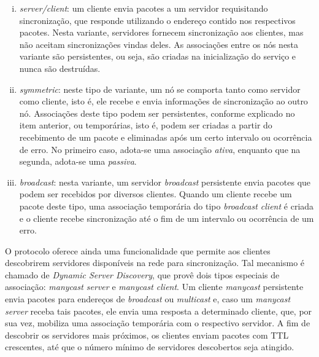 \begin {enumerate}[i.]
  
  \item \textit{server/client}: um cliente envia pacotes a um servidor
  requisitando sincronização, que responde utilizando o endereço contido nos
  respectivos pacotes. Nesta variante, servidores fornecem sincronização aos
  clientes, mas não aceitam sincronizações vindas deles. As associações
  entre os nós nesta variante são persistentes, ou seja, são criadas na
  inicialização do serviço e nunca são destruídas.
  
  \item \textit{symmetric}: neste tipo de variante, um nó se comporta tanto como
  servidor como cliente, isto é, ele recebe e envia informações de sincronização
  ao outro nó. Associações deste tipo podem ser persistentes, conforme explicado
  no item anterior, ou temporárias, isto é, podem ser criadas a partir do
  recebimento de um pacote e eliminadas após um certo intervalo ou ocorrência
  de erro. No primeiro caso, adota-se uma associação \textit{ativa}, enquanto
  que na segunda, adota-se uma \textit{passiva}.
      
  \item \textit{broadcast}: nesta variante, um servidor \textit{broadcast}
  persistente envia pacotes que podem ser recebidos por diversos clientes.
  Quando um cliente recebe um pacote deste tipo, uma associação temporária do
  tipo \textit{broadcast client} é criada e o cliente recebe sincronização até o
  fim de um intervalo ou ocorrência de um erro.
  
\end{enumerate}

O protocolo oferece ainda uma funcionalidade que permite aos clientes
descobrirem servidores disponíveis na rede para sincronização. Tal mecanismo é
chamado de \textit{Dynamic Server Discovery}, que provê dois tipos especiais de
associação: \textit{manycast server} e \textit{manycast client}. Um cliente
\textit{manycast} persistente envia pacotes para endereços de \textit{broadcast}
ou \textit{multicast} e, caso um \textit{manycast server} receba tais pacotes,
ele envia uma resposta a determinado cliente, que, por sua vez, mobiliza uma
associação temporária com o respectivo servidor. A fim de descobrir os
servidores mais próximos, os clientes enviam pacotes com TTL crescentes, até que
o número mínimo de servidores descobertos seja atingido.

\vspace{12pt}

